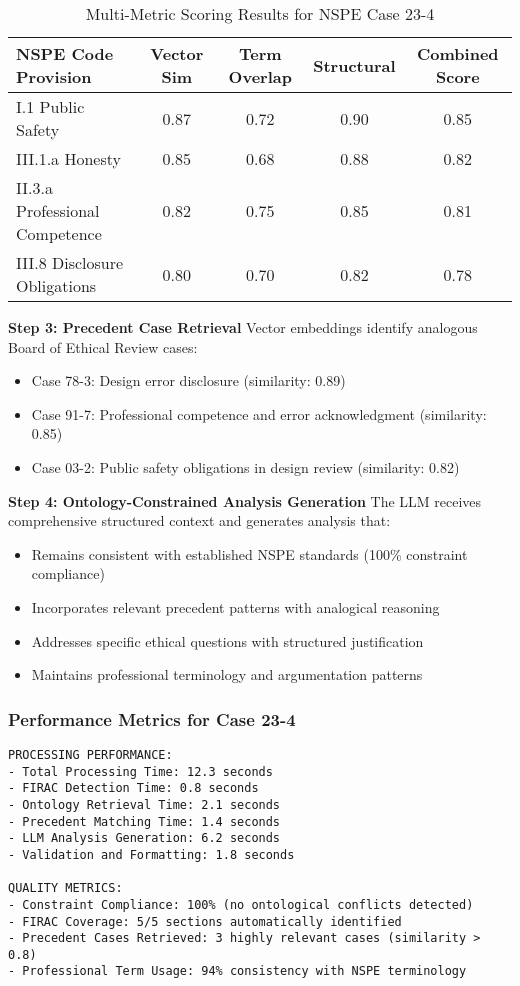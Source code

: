 \begin{table}[htbp]
\caption{Multi-Metric Scoring Results for NSPE Case 23-4}
\label{tab:multimetric-scores}
\centering
\begin{tabular}{|l|c|c|c|c|}
\hline
\textbf{NSPE Code Provision} & \textbf{Vector Sim} & \textbf{Term Overlap} & \textbf{Structural} & \textbf{Combined Score} \\
\hline
I.1 Public Safety & 0.87 & 0.72 & 0.90 & 0.85 \\
\hline
III.1.a Honesty & 0.85 & 0.68 & 0.88 & 0.82 \\
\hline
II.3.a Professional Competence & 0.82 & 0.75 & 0.85 & 0.81 \\
\hline
III.8 Disclosure Obligations & 0.80 & 0.70 & 0.82 & 0.78 \\
\hline
\end{tabular}
\end{table}

\textbf{Step 3: Precedent Case Retrieval}
Vector embeddings identify analogous Board of Ethical Review cases:
\begin{itemize}
\item Case 78-3: Design error disclosure (similarity: 0.89)
\item Case 91-7: Professional competence and error acknowledgment (similarity: 0.85)
\item Case 03-2: Public safety obligations in design review (similarity: 0.82)
\end{itemize}

\textbf{Step 4: Ontology-Constrained Analysis Generation}
The LLM receives comprehensive structured context and generates analysis that:
\begin{itemize}
\item Remains consistent with established NSPE standards (100\% constraint compliance)
\item Incorporates relevant precedent patterns with analogical reasoning
\item Addresses specific ethical questions with structured justification
\item Maintains professional terminology and argumentation patterns
\end{itemize}

\subsubsection{Performance Metrics for Case 23-4}

\begin{verbatim}
PROCESSING PERFORMANCE:
- Total Processing Time: 12.3 seconds
- FIRAC Detection Time: 0.8 seconds
- Ontology Retrieval Time: 2.1 seconds
- Precedent Matching Time: 1.4 seconds
- LLM Analysis Generation: 6.2 seconds
- Validation and Formatting: 1.8 seconds

QUALITY METRICS:
- Constraint Compliance: 100% (no ontological conflicts detected)
- FIRAC Coverage: 5/5 sections automatically identified
- Precedent Cases Retrieved: 3 highly relevant cases (similarity > 0.8)
- Professional Term Usage: 94% consistency with NSPE terminology
\end{verbatim}

